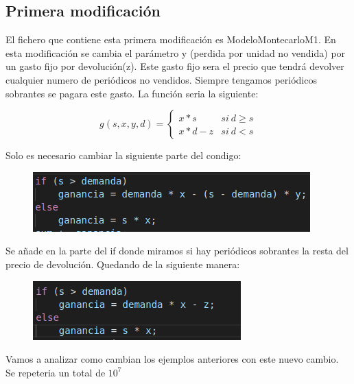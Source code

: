\documentclass[]{article}
\begin{document}
\subsection{Primera modificación}

El fichero que contiene esta primera modificación es ModeloMontecarloM1. En esta modificación se cambia el parámetro y (perdida por unidad no vendida) por un gasto fijo por devolución(z). Este gasto fijo sera el precio que tendrá devolver cualquier numero de periódicos no vendidos. Siempre tengamos periódicos sobrantes se pagara este gasto. La función seria la siguiente:



$$
g(s, x, y, d)=\left\{\begin{array}{ll}{x * s} & { { si\ } d \geq s} \\ {x * d-z} & { { si \ } d<s}\end{array}\right.
$$

Solo es necesario cambiar la siguiente parte del condigo:
\begin{figure}[H]
	\centering
	\includegraphics[width=1\linewidth]{img/screenshot003}
	\caption{}
\end{figure}

Se añade en la parte del if donde miramos si hay periódicos sobrantes la resta del precio de devolución. Quedando de la siguiente manera:

\begin{figure}[H]
	\centering
	\includegraphics[width=1\linewidth]{img/screenshot005}
	\caption{}
	\label{fig:screenshot005}
\end{figure}

Vamos a analizar como cambian los ejemplos anteriores con este nuevo cambio. Se repeteria un total de $10^{7}$
\end{document}
